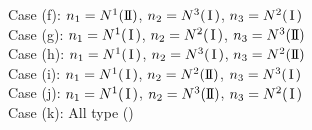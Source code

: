 \documentclass[11pt]{amsart}
\numberwithin{equation}{section} \numberwithin{theorem}{section}
\begin{document}
\begin{tabbing}
	\>Case (f): \>$n_1 = N^1({\text{I \hspace{-2.8mm} I} })$, \>$n_2 = N^3({\hspace{0.5mm}\text{I}\hspace{0.5mm}})$, \>$n_3 = N^2({\hspace{0.5mm}\text{I}\hspace{0.5mm}})$\\
	
	\>Case (g): \>$n_1 = N^1({\hspace{0.5mm}\text{I}\hspace{0.5mm}})$, \>$n_2 = N^2({\hspace{0.5mm}\text{I}\hspace{0.5mm}})$, \>$n_3 = N^3({\text{I \hspace{-2.8mm} I} })$\\
	
	\>Case (h): \>$n_1 = N^1({\hspace{0.5mm}\text{I}\hspace{0.5mm}})$, \>$n_2 = N^3({\hspace{0.5mm}\text{I}\hspace{0.5mm}})$, \>$n_3 = N^2({\text{I \hspace{-2.8mm} I} })$\\
	
	\>Case (i): \>$n_1 = N^1({\hspace{0.5mm}\text{I}\hspace{0.5mm}})$, \>$n_2 = N^2({\text{I \hspace{-2.8mm} I} })$, \>$n_3 = N^3({\hspace{0.5mm}\text{I}\hspace{0.5mm}})$\\
	
	\>Case (j): \>$n_1 = N^1({\hspace{0.5mm}\text{I}\hspace{0.5mm}})$, \>$n_2 = N^3({\text{I \hspace{-2.8mm} I} })$, \>$n_3 = N^2({\hspace{0.5mm}\text{I}\hspace{0.5mm}})$\\
	
	\>Case (k): \>All type ({\hspace{0.5mm}\hspace{0.5mm}})\\
	
	
\end{tabbing}
\end{document}
